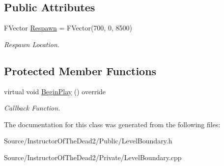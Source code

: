 \subsection*{Public Attributes}
\begin{DoxyCompactItemize}
\item 
\mbox{\label{class_a_level_boundary_a87be1c7307ff07bd9ad6cf5a51baa7b2}} 
F\+Vector \mbox{\hyperlink{class_a_level_boundary_a87be1c7307ff07bd9ad6cf5a51baa7b2}{Respawn}} = F\+Vector(700, 0, 8500)
\begin{DoxyCompactList}\small\item\em Respawn Location. \end{DoxyCompactList}\end{DoxyCompactItemize}
\subsection*{Protected Member Functions}
\begin{DoxyCompactItemize}
\item 
\mbox{\label{class_a_level_boundary_aacde6fc2bd8835587d940b4b23871841}} 
virtual void \mbox{\hyperlink{class_a_level_boundary_aacde6fc2bd8835587d940b4b23871841}{Begin\+Play}} () override
\begin{DoxyCompactList}\small\item\em Callback Function. \end{DoxyCompactList}\end{DoxyCompactItemize}


The documentation for this class was generated from the following files\+:\begin{DoxyCompactItemize}
\item 
Source/\+Instructor\+Of\+The\+Dead2/\+Public/Level\+Boundary.\+h\item 
Source/\+Instructor\+Of\+The\+Dead2/\+Private/Level\+Boundary.\+cpp\end{DoxyCompactItemize}
